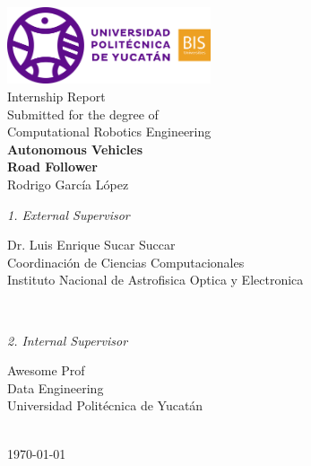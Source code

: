 \begin{titlepage}
	\tgherosfont
	\centering

	\includegraphics[width=6cm]{Figures/logo} \\[2mm]
	\textsf{Internship Report} \\
	\textsf{Submitted for the degree of} \\
	\textsf{Computational Robotics Engineering} \\

	\vfill
	{\LARGE \textbf{Autonomous Vehicles \\ Road Follower} \\[10mm]}
	{\Large Rodrigo García López} \\

	\vfill
	\begin{minipage}[t]{.27\textwidth}
		\raggedleft
		\textit{1. External Supervisor}
	\end{minipage}
	\hspace*{15pt}
	\begin{minipage}[t]{.65\textwidth}
		{\Large Dr. Luis Enrique Sucar Succar} \\
	  	{\small Coordinación de Ciencias Computacionales} \\[-1mm]
		{\small Instituto Nacional de Astrofisica Optica y Electronica}
	\end{minipage} \\[5mm]
	\begin{minipage}[t]{.27\textwidth}
		\raggedleft
		\textit{2. Internal Supervisor}
	\end{minipage}
	\hspace*{15pt}
	\begin{minipage}[t]{.65\textwidth}
		{\Large Awesome Prof} \\
	  	{\small Data Engineering} \\[-1mm]
		{\small Universidad Politécnica de Yucatán}
	\end{minipage} \\[10mm]

	\today \\

\end{titlepage}

